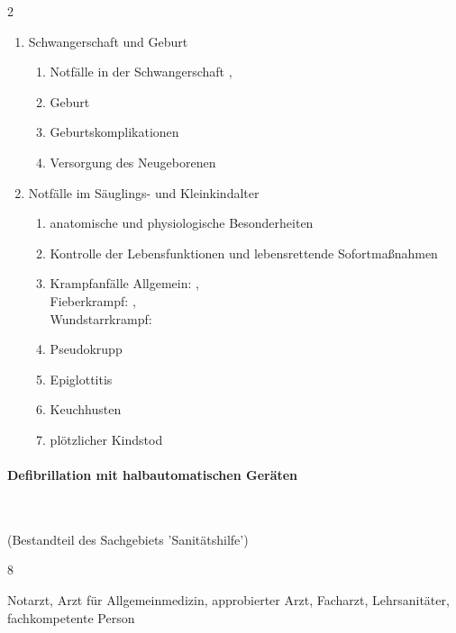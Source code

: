 \begin{WidePar}
\begin{multicols}{2}
\begin{enumerate}
\begin{enumerate}
    \end{enumerate}
    \item
    Schwangerschaft und Geburt
    \begin{enumerate}
      \item      Notfälle in der Schwangerschaft \dotfill  {},  
      \item      Geburt \dotfill      {}
      \item      Geburtskomplikationen \dotfill     {}
      \item      Versorgung des Neugeborenen \dotfill  {}
    \end{enumerate}
    \item Notfälle im Säuglings- und Kleinkindalter
    \begin{enumerate}
      \item      anatomische und physiologische Besonderheiten \dotfill     {}
      \item      Kontrolle der Lebensfunktionen und lebensrettende Sofortmaßnahmen \dotfill  {}
      \item      Krampfanfälle \dotfill Allgemein: ,
      \\       Fieberkrampf:  \dotfill {},
      \\      Wundstarrkrampf:  \dotfill {}
      \item      Pseudokrupp \dotfill  {}
      \item      Epiglottitis \dotfill  {}
      \item      Keuchhusten \dotfill  {}
      \item      plötzlicher Kindstod \dotfill    {}
    \end{enumerate}
  \end{enumerate}

\paragraph{Defibrillation mit halbautomatischen Geräten}~
  
  (Bestandteil des Sachgebiets  'Sanitätshilfe')
  
  \begin{inparadesc}
    \item[Stundenanzahl:]   8
    \item[Lehrkraft:]   Notarzt,  Arzt für Allgemeinmedizin,  approbierter Arzt,
    Facharzt, Lehrsanitäter, fachkompetente Person
  \end{inparadesc}
  

\end{multicols}
\end{WidePar}
